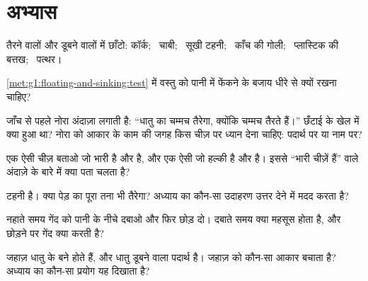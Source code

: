 \section{अभ्यास}

\begin{exercise}[$\star$]\label{exo:g1:floating-and-sinking:1}
तैरने वालों और डूबने वालों में छाँटो: कॉर्क; \ चाबी; \ सूखी टहनी;
\ काँच की गोली; \ प्लास्टिक की बत्तख; \ पत्थर।
\end{exercise}

\begin{exercise}[$\star$]\label{exo:g1:floating-and-sinking:2}
\cref{met:g1:floating-and-sinking:test} में वस्तु को पानी में फेंकने
के बजाय धीरे से क्यों रखना चाहिए?
\end{exercise}

\begin{exercise}[$\star$]\label{exo:g1:floating-and-sinking:3}
जाँच से पहले नोरा अंदाज़ा लगाती है: ``धातु का चम्मच तैरेगा, क्योंकि
चम्मच तैरते हैं।'' छँटाई के खेल में क्या हुआ था? नोरा को आकार के काम
की जगह किस चीज़ पर ध्यान देना चाहिए: पदार्थ पर या नाम पर?
\end{exercise}

\begin{exercise}[$\star$]\label{exo:g1:floating-and-sinking:4}
एक ऐसी चीज़ बताओ जो भारी है और  है, और एक ऐसी जो हल्की है और
 है। इससे ``भारी चीज़ें  हैं'' वाले अंदाज़े के बारे में क्या
पता चलता है?
\end{exercise}

\begin{exercise}[$\star$]\label{exo:g1:floating-and-sinking:5}
टहनी  है। क्या पेड़ का पूरा तना भी तैरेगा? अध्याय का कौन-सा
उदाहरण उत्तर देने में मदद करता है?
\end{exercise}

\begin{exercise}[$\star$]\label{exo:g1:floating-and-sinking:6}
नहाते समय  गेंद को पानी के नीचे दबाओ और फिर छोड़ दो। दबाते समय
क्या महसूस होता है, और छोड़ने पर गेंद क्या करती है?
\end{exercise}

\begin{exercise}[$\star$]\label{exo:g1:floating-and-sinking:7}
जहाज़ धातु के बने होते हैं, और धातु डूबने वाला पदार्थ है। जहाज़ को
कौन-सा आकार बचाता है? अध्याय का कौन-सा प्रयोग यह दिखाता है?
\end{exercise}

